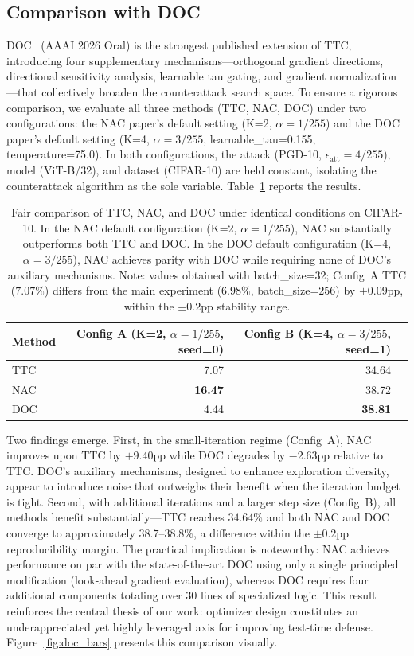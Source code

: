 \documentclass[pdflatex,sn-basic,Numbered]{sn-jnl}
\theoremstyle{thmstyleone}
\theoremstyle{thmstyletwo}
\theoremstyle{thmstylethree}
\begin{document}
\subsection{Comparison with DOC}

DOC~\cite{jiang2026diversifying} (AAAI 2026 Oral) is the strongest published extension of TTC, introducing four supplementary mechanisms---orthogonal gradient directions, directional sensitivity analysis, learnable tau gating, and gradient normalization---that collectively broaden the counterattack search space. To ensure a rigorous comparison, we evaluate all three methods (TTC, NAC, DOC) under two configurations: the NAC paper's default setting (K=2, $\alpha=1/255$) and the DOC paper's default setting (K=4, $\alpha=3/255$, learnable\_tau=0.155, temperature=75.0). In both configurations, the attack (PGD-10, $\epsilon_{\text{att}}=4/255$), model (ViT-B/32), and dataset (CIFAR-10) are held constant, isolating the counterattack algorithm as the sole variable. Table~\ref{tab:doc} reports the results.

\begin{table}[ht]\centering\small
\caption{Fair comparison of TTC, NAC, and DOC under identical conditions on CIFAR-10. In the NAC default configuration (K=2, $\alpha=1/255$), NAC substantially outperforms both TTC and DOC. In the DOC default configuration (K=4, $\alpha=3/255$), NAC achieves parity with DOC while requiring none of DOC's auxiliary mechanisms. Note: values obtained with batch\_size=32; Config~A TTC ($7.07\%$) differs from the main experiment ($6.98\%$, batch\_size=256) by $+0.09$pp, within the $\pm 0.2$pp stability range.}\label{tab:doc}
\begin{tabular}{@{}lrrr@{}}
\toprule
Method & Config A (K=2, $\alpha{=}1/255$, seed=0) & Config B (K=4, $\alpha{=}3/255$, seed=1) \\
\midrule
TTC & 7.07 & 34.64 \\
NAC & \textbf{16.47} & 38.72 \\
DOC & 4.44 & \textbf{38.81} \\
\bottomrule
\end{tabular}
\end{table}

Two findings emerge. First, in the small-iteration regime (Config~A), NAC improves upon TTC by $+9.40$pp while DOC degrades by $-$2.63pp relative to TTC. DOC's auxiliary mechanisms, designed to enhance exploration diversity, appear to introduce noise that outweighs their benefit when the iteration budget is tight. Second, with additional iterations and a larger step size (Config~B), all methods benefit substantially---TTC reaches $34.64\%$ and both NAC and DOC converge to approximately $38.7$--$38.8\%$, a difference within the $\pm 0.2$pp reproducibility margin. The practical implication is noteworthy: NAC achieves performance on par with the state-of-the-art DOC using only a single principled modification (look-ahead gradient evaluation), whereas DOC requires four additional components totaling over 30 lines of specialized logic. This result reinforces the central thesis of our work: optimizer design constitutes an underappreciated yet highly leveraged axis for improving test-time defense. Figure~\ref{fig:doc_bars} presents this comparison visually.
\end{document}
